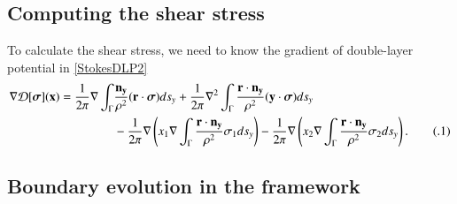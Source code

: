 \documentclass[preprint, 10pt]{elsarticle}
\newcommand{\D}{\mbox{${\mathcal D}$}}
\newcommand\numberthis{\addtocounter{equation}{1}\tag{\theequation}}
\begin{document}
%
%
%

 
\subsection{Computing the shear stress}
\label{sec:shearStressLP}

To calculate the shear stress, we need to know the gradient of double-layer potential in \eqref{StokesDLP2} 
\begin{align*}\label{SSLP}
\nabla\D[\boldsymbol\sigma]({\bf x})=\frac{1}{2\pi}\nabla\int_{\Gamma}&\frac{{\bf n_y}}{\rho^2}({\bf r} \cdot {\boldsymbol \sigma})ds_y+\frac{1}{2\pi}\nabla^2\int_{\Gamma}\frac{{\bf r} \cdot {\bf n_y}}{\rho^2}({\bf y} \cdot{\boldsymbol \sigma})ds_y\\
&-\frac{1}{2\pi}\nabla\left(x_1 \nabla\int_{\Gamma}\frac{{\bf r} \cdot {\bf n_y}}{\rho^2}\sigma_1ds_y\right)-\frac{1}{2\pi}\nabla\left(x_2\nabla\int_{\Gamma}\frac{{\bf r} \cdot {\bf n_y}}{\rho^2}\sigma_2ds_y\right). \numberthis
\end{align*}




\subsection{Boundary evolution in the {\thL} framework} 
\label{sec:thetaL}


\end{document}
